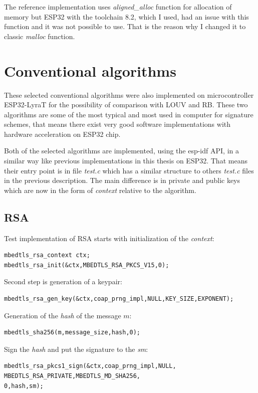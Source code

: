 \documentclass[thesis=M,english]{FITthesis}[2019/12/23]
\begin{document}
\bigskip
\noindent
The reference implementation uses \textit{aligned\_alloc} function for allocation of memory but ESP32 with the toolchain 8.2, which I used, had an issue with this function and it was not possible to use. That is the reason why I changed it to classic \textit{malloc} function.

\newpage
\section{Conventional algorithms}
These selected conventional algorithms were also implemented on microcontroller ESP32-LyraT for the possibility of comparison with LOUV and RB. These two algorithms are some of the most typical and most used in computer for signature schemes, that means there exist very good software implementations with hardware acceleration on ESP32 chip.

\bigskip
\noindent
Both of the selected algorithms are implemented, using the esp-idf API, in a similar way like previous implementations in this thesis on ESP32. That means their entry point is in file \textit{test.c} which has a similar structure to others \textit{test.c} files in the previous description. The main difference is in private and public keys which are now in the form of \textit{context} relative to the algorithm.

\subsection{RSA}
Test implementation of RSA starts with initialization of the \textit{context}:
\begin{lstlisting}[frame=single]
mbedtls_rsa_context ctx;
mbedtls_rsa_init(&ctx,MBEDTLS_RSA_PKCS_V15,0);
\end{lstlisting}

\noindent
Second step is generation of a keypair:
\begin{lstlisting}[frame=single]
mbedtls_rsa_gen_key(&ctx,coap_prng_impl,NULL,KEY_SIZE,EXPONENT);
\end{lstlisting}

\noindent
Generation of the \textit{hash} of the message $m$:
\begin{lstlisting}[frame=single]
mbedtls_sha256(m,message_size,hash,0);
\end{lstlisting}

\noindent
Sign the \textit{hash} and put the signature to the \textit{sm}:
\begin{lstlisting}[frame=single]
mbedtls_rsa_pkcs1_sign(&ctx,coap_prng_impl,NULL,
MBEDTLS_RSA_PRIVATE,MBEDTLS_MD_SHA256,
0,hash,sm);
\end{lstlisting}
\end{document}
